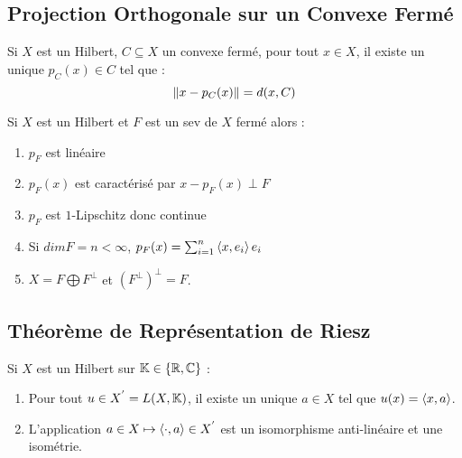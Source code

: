 \documentclass{cours}
\begin{document}
\subsection{Projection Orthogonale sur un Convexe Fermé}
\begin{theorem}
    Si $X$ est un Hilbert, $C \subseteq X$ un convexe fermé, pour tout $x \in X$, il existe un unique $p_{C}(x) \in C$ tel que :
    \[
        \left\lVert x - p_{C}(x) \right\rVert = d(x, C)
    \]
\end{theorem}
\begin{corollary}
    Si $X$ est un Hilbert et $F$ est un sev de $X$ fermé alors : 
    \begin{enumerate}
        \item $p_{F}$ est linéaire
        \item $p_{F}(x)$ est caractérisé par $x - p_{F}(x) \perp F$
        \item $p_{F}$ est $1$-Lipschitz donc continue
        \item Si $dim F = n < \infty$, $p_{F}(x) = \sum_{i = 1}^{n}\left\langle x, e_{i} \right\rangle e_{i}$
        \item $X = F \bigoplus F^{\perp}$ et $\left(F^{\perp}\right)^{\perp} = F$.
    \end{enumerate}
\end{corollary}

\subsection{Théorème de Représentation de Riesz}
\begin{theorem}
    Si $X$ est un Hilbert sur $\mathbb{K} \in \left\{\mathbb{R}, \mathbb{C}\right\}$ : 
    \begin{enumerate}
        \item Pour tout $u \in X^{'} = L(X, \mathbb{K})$, il existe un unique $a\in X$ tel que $u(x) = \left\langle x, a \right\rangle$.
        \item L'application $a \in X \mapsto \left\langle \cdot, a \right\rangle \in X^{'}$ est un isomorphisme anti-linéaire et une isométrie. 
    \end{enumerate}    
\end{theorem}
\end{document}
